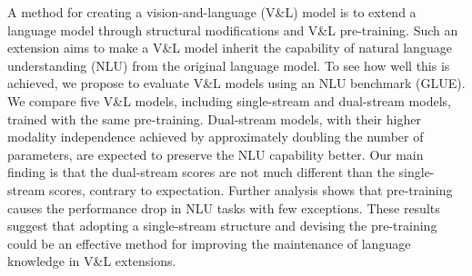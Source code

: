 A method for creating a vision-and-language (V\&L) model is to extend a language model through structural modifications and V\&L pre-training. Such an extension aims to make a V\&L model inherit the capability of natural language understanding (NLU) from the original language model. To see how well this is achieved, we propose to evaluate V\&L models using an NLU benchmark (GLUE). We compare five V\&L models, including single-stream and dual-stream models, trained with the same pre-training. Dual-stream models, with their higher modality independence achieved by approximately doubling the number of parameters, are expected to preserve the NLU capability better. Our main finding is that the dual-stream scores are not much different than the single-stream scores, contrary to expectation. Further analysis shows that pre-training causes the performance drop in NLU tasks with few exceptions. These results suggest that adopting a single-stream structure and devising the pre-training could be an effective method for improving the maintenance of language knowledge in V\&L extensions.
